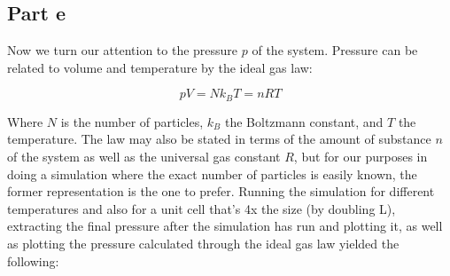 \documentclass[a4paper,12pt]{article}
\begin{document}
\subsection*{Part e}

Now we turn our attention to the pressure $p$ of the system. Pressure can be related to volume and temperature by the
ideal gas law:

$$
  pV = Nk_BT = nRT
$$

Where $N$ is the number of particles, $k_B$ the Boltzmann constant, and $T$ the temperature. The law may also be
stated in terms of the amount of substance $n$ of the system as well as the universal gas constant $R$, but for our
purposes in doing a simulation where the exact number of particles is easily known, the former representation is the
one to prefer. Running the simulation for different temperatures and also for a unit cell that's 4x the size (by
doubling L), extracting the final pressure after the simulation has run and plotting it, as well as plotting the 
pressure calculated through the ideal gas law yielded the following:
\end{document}
